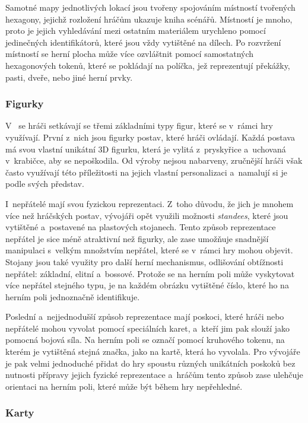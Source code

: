 Samotné mapy jednotlivých lokací jsou tvořeny spojováním místností tvořených hexagony, jejichž rozložení hráčům ukazuje kniha scénářů. Místností je mnoho, proto je jejich vyhledávání mezi ostatním materiálem urychleno pomocí jedinečných identifikátorů, které jsou vždy vytištěné na dílech. Po rozvržení místností se herní plocha může více ozvláštnit pomocí samostatných hexagonových tokenů, které se pokládají na políčka, jež reprezentují překážky, pasti, dveře, nebo jiné herní prvky.

\subsubsection*{Figurky}
\label{subsubsec:gh_comp_figures}

V~ se hráči setkávají se třemi základními typy figur, které se v~rámci hry využívají. První z~nich jsou figurky postav, které hráči ovládají. Každá postava má svou vlastní unikátní 3D figurku, která je vylitá z~pryskyřice a~uchovaná v~krabičce, aby se nepoškodila. Od výroby nejsou nabarveny, zručnější hráči však často využívají této příležitosti na jejich vlastní personalizaci a~namalují si je podle svých představ.

I~nepřátelé mají svou fyzickou reprezentaci. Z~toho důvodu, že jich je mnohem více než hráčských postav, vývojáři opět využili možnosti \textit{standees}, které jsou vytištěné a~postavené na plastových stojanech. Tento způsob reprezentace nepřátel je sice méně atraktivní než figurky, ale zase umožňuje snadnější manipulaci s~velkým množstvím nepřátel, které se v~rámci hry mohou objevit. Stojany jsou také využity pro další herní mechanismus, odlišování obtížnosti nepřátel: základní, elitní a~bossové. Protože se na herním poli může vyskytovat více nepřátel stejného typu, je na každém obrázku vytištěné číslo, které ho na herním poli jednoznačně identifikuje.

Poslední a~nejjednodušší způsob reprezentace mají poskoci, které hráči nebo nepřátelé mohou vyvolat pomocí speciálních karet, a~kteří jim pak slouží jako pomocná bojová síla. Na herním poli se označí pomocí kruhového tokenu, na kterém je vytištěná stejná značka, jako na kartě, která ho vyvolala. Pro vývojáře je pak velmi jednoduché přidat do hry spoustu různých unikátních poskoků bez nutnosti přípravy jejich fyzické reprezentace a~hráčům tento způsob zase ulehčuje orientaci na herním poli, které může být během hry nepřehledné.

\subsubsection*{Karty}
\label{subsubsec:gh_comp_cards}

